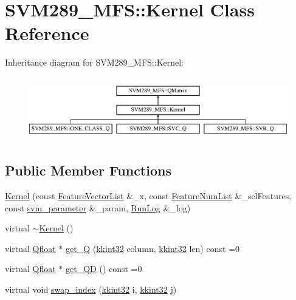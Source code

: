 \hypertarget{class_s_v_m289___m_f_s_1_1_kernel}{}\section{S\+V\+M289\+\_\+\+M\+FS\+:\+:Kernel Class Reference}
\label{class_s_v_m289___m_f_s_1_1_kernel}
Inheritance diagram for S\+V\+M289\+\_\+\+M\+FS\+:\+:Kernel\+:\begin{figure}[H]
\begin{center}
\leavevmode
\includegraphics[height=2.786070cm]{class_s_v_m289___m_f_s_1_1_kernel}
\end{center}
\end{figure}
\subsection*{Public Member Functions}
\begin{DoxyCompactItemize}
\item 
\hyperlink{class_s_v_m289___m_f_s_1_1_kernel_adaef8fcc49a7eb9e702e9c61588f6306}{Kernel} (const \hyperlink{class_k_k_m_l_l_1_1_feature_vector_list}{Feature\+Vector\+List} \&\+\_\+x, const \hyperlink{class_k_k_m_l_l_1_1_feature_num_list}{Feature\+Num\+List} \&\+\_\+sel\+Features, const \hyperlink{struct_s_v_m289___m_f_s_1_1svm__parameter}{svm\+\_\+parameter} \&\+\_\+param, \hyperlink{class_k_k_b_1_1_run_log}{Run\+Log} \&\+\_\+log)
\item 
virtual \hyperlink{class_s_v_m289___m_f_s_1_1_kernel_afd0aeed8502e5f41bb1becb6ccc3302e}{$\sim$\+Kernel} ()
\item 
virtual \hyperlink{namespace_s_v_m289___m_f_s_a440663a1b8d42bc10329401883645ae1}{Qfloat} $\ast$ \hyperlink{class_s_v_m289___m_f_s_1_1_kernel_a32fcb5e969c48947b8f45d3bab216dc2}{get\+\_\+Q} (\hyperlink{namespace_k_k_b_a8fa4952cc84fda1de4bec1fbdd8d5b1b}{kkint32} column, \hyperlink{namespace_k_k_b_a8fa4952cc84fda1de4bec1fbdd8d5b1b}{kkint32} len) const  =0
\item 
virtual \hyperlink{namespace_s_v_m289___m_f_s_a440663a1b8d42bc10329401883645ae1}{Qfloat} $\ast$ \hyperlink{class_s_v_m289___m_f_s_1_1_kernel_a1ade293dfac5822b2192e4a169d1f4c4}{get\+\_\+\+QD} () const  =0
\item 
virtual void \hyperlink{class_s_v_m289___m_f_s_1_1_kernel_a8a8d393c7c515fe3f76f3f647bb252e1}{swap\+\_\+index} (\hyperlink{namespace_k_k_b_a8fa4952cc84fda1de4bec1fbdd8d5b1b}{kkint32} i, \hyperlink{namespace_k_k_b_a8fa4952cc84fda1de4bec1fbdd8d5b1b}{kkint32} j)
\end{DoxyCompactItemize}
